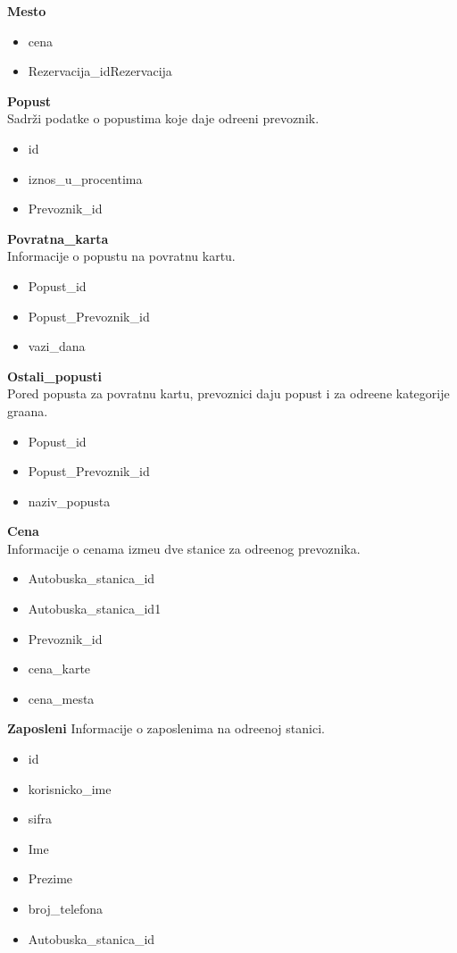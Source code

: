 \textbf{Mesto}
\begin{itemize}
	\item cena
	\item Rezervacija\_idRezervacija
\end{itemize}
\textbf{Popust} \\
Sadr\v zi podatke o popustima koje daje odre\dj{}eni prevoznik.
\begin{itemize}
	\item id
	\item iznos\_u\_procentima
	\item Prevoznik\_id
\end{itemize}
\textbf{Povratna\_karta}\\
Informacije o popustu na povratnu kartu.
\begin{itemize}
	\item Popust\_id
	\item Popust\_Prevoznik\_id
	\item vazi\_dana
\end{itemize}
\textbf{Ostali\_popusti} \\
Pored popusta za povratnu kartu, prevoznici daju popust i za odre\dj{}ene kategorije gra\dj{}ana.
\begin{itemize}
	\item Popust\_id
	\item Popust\_Prevoznik\_id
	\item naziv\_popusta
\end{itemize}
\textbf{Cena}\\
Informacije o cenama izme\dj{}u dve stanice za odre\dj{}enog prevoznika.
\begin{itemize}
	\item Autobuska\_stanica\_id
	\item Autobuska\_stanica\_id1
	\item Prevoznik\_id
	\item cena\_karte
	\item cena\_mesta
\end{itemize}
\textbf{Zaposleni}
Informacije o zaposlenima na odre\dj{}enoj stanici.
\begin{itemize}
	\item id
	\item korisnicko\_ime
	\item sifra
	\item Ime
	\item Prezime
	\item broj\_telefona
	\item Autobuska\_stanica\_id
\end{itemize}
\newpage
